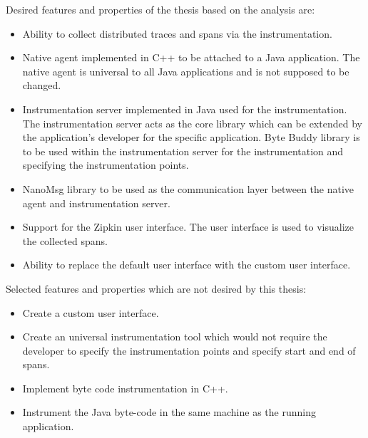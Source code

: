 Desired features and properties of the thesis based on the analysis are:
\begin{itemize}
	\item Ability to collect distributed traces and spans via the instrumentation.
	\item Native agent implemented in C++ to be attached to a Java application. The native agent is universal to all Java applications and is not supposed to be changed.
	\item Instrumentation server implemented in Java used for the instrumentation. The instrumentation server acts as the core library which can be extended by the application's developer for the specific application. Byte Buddy library is to be used within the instrumentation server for the instrumentation and specifying the instrumentation points.
	\item NanoMsg library to be used as the communication layer between the native agent and instrumentation server.
	\item Support for the Zipkin user interface. The user interface is used to visualize the collected spans.
	\item Ability to replace the default user interface with the custom user interface.
\end{itemize}

Selected features and properties which are not desired by this thesis:
\begin{itemize}
	\item Create a custom user interface. 
	\item Create an universal instrumentation tool which would not require the developer to specify the instrumentation points and specify start and end of spans.
	\item Implement byte code instrumentation in C++.
	\item Instrument the Java byte-code in the same machine as the running application.
\end{itemize}

